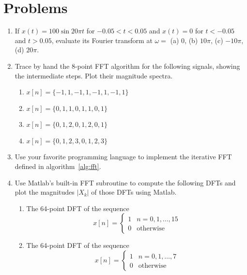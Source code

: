 \section{Problems}

\begin{enumerate}
\item If $x(t)=100\sin 20\pi t$ for $-0.05<t<0.05$ and $x(t)=0$ for
$t<-0.05$ and $t>0.05$, evaluate its Fourier transform at $\omega=$
(a) 0, (b) $10\pi$, (c) $-10\pi$, (d) $20\pi$.

\item Trace by hand the 8-point FFT algorithm for the following signals,
  showing the intermediate steps. Plot their magnitude spectra.
\begin{enumerate}
\item $x[n] = \{-1, 1, -1, 1, -1, 1, -1, 1\} $

\item $x[n] = \{0,1,1,0,1,1,0,1\}$

\item $x[n] = \{0,1,2,0,1,2,0,1\}$

\item $x[n] = \{0,1,2,3,0,1,2,3\}$
\end{enumerate}

\item Use your favorite programming language to implement the
iterative FFT defined in algorithm~\ref{alg:fft}.

\item Use Matlab's built-in FFT subroutine to compute the following
DFTs and plot the magnitudes $|X_k|$ of those DFTs using Matlab.
\begin{enumerate}
\item The 64-point DFT of the sequence
\begin{equation*}
x[n]=\left\{\begin{array}{ll}
                        1 &  n=0,1,\ldots,15 \\
                        0 &  \text{otherwise}
           \end{array}\right.
\end{equation*}

\item The 64-point DFT of the sequence 
\label{it:64}
\begin{equation*}
x[n]=\left\{\begin{array}{ll}
                        1 & n=0,1,\ldots,7 \\
                        0 & \text{otherwise}
           \end{array}\right.
\end{equation*}


\end{enumerate}
\end{enumerate}
